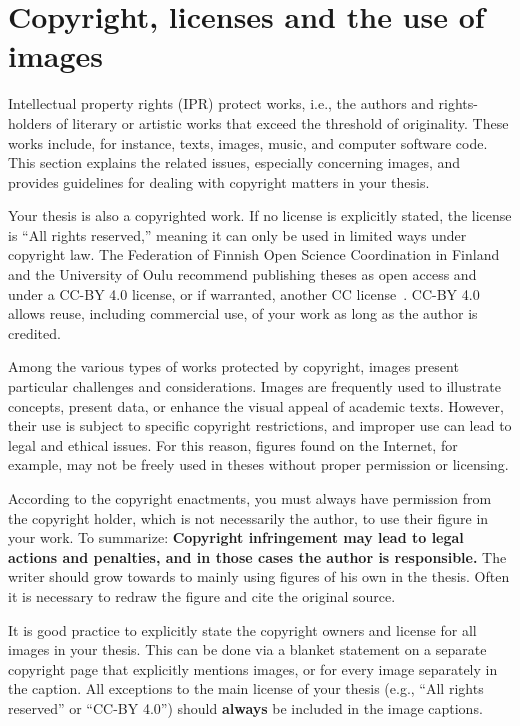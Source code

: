 \section{Copyright, licenses and the use of images}
\label{copyright}
Intellectual property rights (IPR) protect works, i.e., the authors
and rights-holders of literary or artistic works that exceed the
threshold of originality. These works include, for instance, texts,
images, music, and computer software code. This section explains the
related issues, especially concerning images, and provides guidelines
for dealing with copyright matters in your thesis.

Your thesis is also a copyrighted work. If no license is explicitly
stated, the license is \enquote{All rights reserved,} meaning it can only be
used in limited ways under copyright law. The Federation of Finnish
Open Science Coordination in Finland and the University of Oulu
recommend publishing theses as open access and under a CC-BY 4.0 license,
or if warranted, another CC license~\cite{coordination_open_2024}.
CC-BY 4.0 allows reuse, including commercial use, of your work as long as
the author is credited.

Among the various types of works protected by copyright, images
present particular challenges and considerations. Images are
frequently used to illustrate concepts, present data, or enhance the
visual appeal of academic texts. However, their use is subject to
specific copyright restrictions, and improper use can lead to legal
and ethical issues.  For this reason, figures found on the Internet,
for example, may not be freely used in theses without proper
permission or licensing.

According to the copyright enactments, you must always have
permission from the copyright holder, which is not necessarily the
author, to use their figure in your work. To summarize:
\textbf{Copyright infringement may lead to legal actions and
penalties, and in those cases the author is responsible.} The writer
should grow towards to mainly using figures of his own in the
thesis. Often it is necessary to redraw the figure and cite the
original source.

It is good practice to explicitly state the copyright owners and
license for all images in your thesis. This can be done via a blanket
statement on a separate copyright page that explicitly mentions
images, or for every image separately in the caption. All exceptions
to the main license of your thesis (e.g., \enquote{All rights reserved} or
\enquote{CC-BY 4.0}) should \textbf{always} be included in the image
captions.

